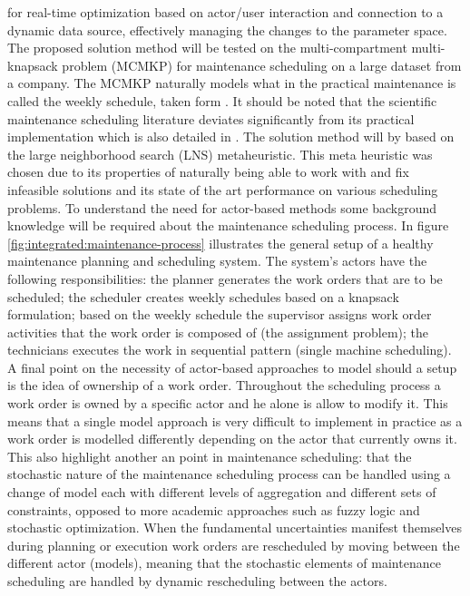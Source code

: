 for real-time optimization based on actor/user interaction and connection to a dynamic data source, effectively managing
the changes to the parameter space. The proposed solution method will be tested on the multi-compartment multi-knapsack
problem (MCMKP) for maintenance scheduling on a large dataset from a company. The MCMKP naturally models what in
the practical maintenance is called the weekly schedule, taken form \citep{palmerMaintenancePlanningScheduling2019}.
It should be noted that the scientific maintenance scheduling literature deviates significantly from its practical
implementation which is also detailed in \citep{palmerMaintenancePlanningScheduling2019}. The solution method will by
based on the large neighborhood search (LNS) metaheuristic. This meta heuristic was chosen due to its properties
of naturally being able to work with and fix infeasible solutions and its state of the art performance on various
scheduling problems. \citep{???} To understand the need for actor-based methods some background knowledge will be required about
the maintenance scheduling process. In figure \ref{fig:integrated:maintenance-process} illustrates the general setup of
a healthy maintenance planning and scheduling system. The system's actors have the following responsibilities: the
planner generates the work orders that are to be scheduled; the scheduler creates weekly schedules based on a knapsack
formulation; based on the weekly schedule the supervisor assigns work order activities that the work order is composed
of (the assignment problem); the technicians executes the work in sequential pattern (single machine scheduling).
A final point on the necessity of actor-based approaches to model should a setup is the idea of ownership of a work
order. Throughout the scheduling process a work order is owned by a specific actor and he alone is allow to modify
it. This means that a single model approach is very difficult to implement in practice as a work order is modelled
differently depending on the actor that currently owns it. This also highlight another an point in maintenance scheduling: that
the stochastic nature of the maintenance scheduling process can be handled using a change of model each with different
levels of aggregation and different sets of constraints, opposed to more academic approaches such as fuzzy logic and 
stochastic optimization. When the fundamental uncertainties manifest themselves during planning or execution work orders
are rescheduled by moving between the different actor (models), meaning that the stochastic elements of maintenance 
scheduling are handled by dynamic rescheduling between the actors.

